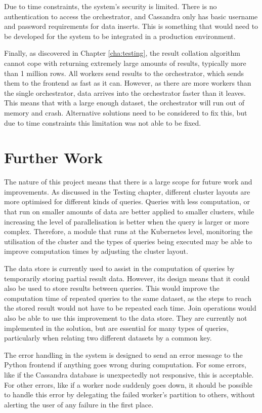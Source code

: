 Due to time constraints, the system's security is limited. There is no authentication to access the orchestrator, and Cassandra only has basic username and password requirements for data inserts. This is something that would need to be developed for the system to be integrated in a production environment.

Finally, as discovered in Chapter \ref{cha:testing}, the result collation algorithm cannot cope with returning extremely large amounts of results, typically more than 1 million rows. All workers send results to the orchestrator, which sends them to the frontend as fast as it can. However, as there are more workers than the single orchestrator, data arrives into the orchestrator faster than it leaves. This means that with a large enough dataset, the orchestrator will run out of memory and crash. Alternative solutions need to be considered to fix this, but due to time constraints this limitation was not able to be fixed.

\section{Further Work}
The nature of this project means that there is a large scope for future work and improvements. As discussed in the Testing chapter, different cluster layouts are more optimised for different kinds of queries. Queries with less computation, or that run on smaller amounts of data are better applied to smaller clusters, while increasing the level of parallelisation is better when the query is larger or more complex. Therefore, a module that runs at the Kubernetes level, monitoring the utilisation of the cluster and the types of queries being executed may be able to improve computation times by adjusting the cluster layout.

The data store is currently used to assist in the computation of queries by temporarily storing partial result data. However, its design means that it could also be used to store results between queries. This would improve the computation time of repeated queries to the same dataset, as the steps to reach the stored result would not have to be repeated each time. Join operations would also be able to use this improvement to the data store. They are currently not implemented in the solution, but are essential for many types of queries, particularly when relating two different datasets by a common key.

The error handling in the system is designed to send an error message to the Python frontend if anything goes wrong during computation. For some errors, like if the Cassandra database is unexpectedly not responsive, this is acceptable. For other errors, like if a worker node suddenly goes down, it should be possible to handle this error by delegating the failed worker's partition to others, without alerting the user of any failure in the first place.


